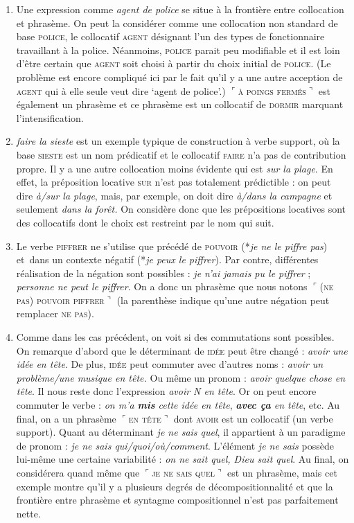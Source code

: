 {    
    \begin{enumerate}
    \item  Une expression comme \textit{agent de police} se situe à la frontière entre collocation et phrasème. On peut la considérer comme une collocation non standard de base \textsc{police}, le collocatif \textsc{agent} désignant l'un des types de fonctionnaire travaillant à la police. Néanmoins, \textsc{police} parait peu modifiable et il est loin d'être certain que \textsc{agent} soit choisi à partir du choix initial de \textsc{police}. (Le problème est encore compliqué ici par le fait qu’il y a une autre acception de \textsc{agent} qui à elle seule veut dire ‘agent de police’.) \textrm{$⌜$}\textsc{à} \textsc{poings} \textsc{fermés}\textrm{$⌝$} est également un phrasème et ce phrasème est un collocatif de \textsc{dormir} marquant l’intensification.
    \item  \textit{faire la sieste} est un exemple typique de construction à verbe support, où la base \textsc{sieste} est un nom prédicatif et le collocatif \textsc{faire} n’a pas de contribution propre. Il y a une autre collocation moins évidente qui est \textit{sur la plage}. En effet, la préposition locative \textsc{sur} n’est pas totalement prédictible : on peut dire \textit{à/sur la plage}, mais, par exemple, on doit dire \textit{à/dans la campagne} et seulement \textit{dans la forêt.} On considère donc que les prépositions locatives sont des collocatifs dont le choix est restreint par le nom qui suit.
    \item  Le verbe \textsc{piffrer} ne s’utilise que précédé de \textsc{pouvoir} (*\textit{je ne le piffre pas}) et~dans un contexte négatif (*\textit{je peux le piffrer}). Par contre, différentes réalisation de la négation sont possibles : \textit{je n’ai jamais pu le piffrer} ; \textit{personne ne peut le piffrer}. On a donc un phrasème que nous notons \textrm{$⌜$}\textsc{(ne} \textsc{pas)} \textsc{pouvoir} \textsc{piffrer}\textrm{$⌝$} (la parenthèse indique qu’une autre négation peut remplacer \textsc{ne} \textsc{pas}).
    \item  Comme dans les cas précédent, on voit si des commutations sont possibles. On remarque d’abord que le déterminant de \textsc{idée} peut être changé : \textit{avoir une idée en tête}. De plus, \textsc{idée} peut commuter avec d’autres noms : \textit{avoir un problème/une musique en tête.} Ou même un pronom : \textit{avoir quelque chose en tête}. Il nous reste donc l’expression \textit{avoir N en tête}. Or on peut encore commuter le verbe : \textit{on m’a \textbf{mis} cette idée en tête}, \textit{\textbf{avec ça} en tête}, etc. Au final, on a un phrasème \textrm{$⌜$}\textsc{en} \textsc{tête}\textrm{$⌝$} dont \textsc{avoir} est un collocatif (un verbe support). Quant au déterminant \textit{je ne sais quel}, il appartient à un paradigme de pronom : \textit{je ne sais qui/quoi/où/comment}. L’élément \textit{je ne sais} possède lui-même une certaine variabilité : \textit{on ne sait quel, Dieu sait quel}. Au final, on considérera quand même que \textrm{$⌜$}\textsc{je} \textsc{ne} \textsc{sais} \textsc{quel}\textrm{$⌝$} est un phrasème, mais cet exemple montre qu’il y a plusieurs degrés de décompositionnalité et que la frontière entre phrasème et syntagme compositionnel n’est pas parfaitement nette.

\end{enumerate}}
